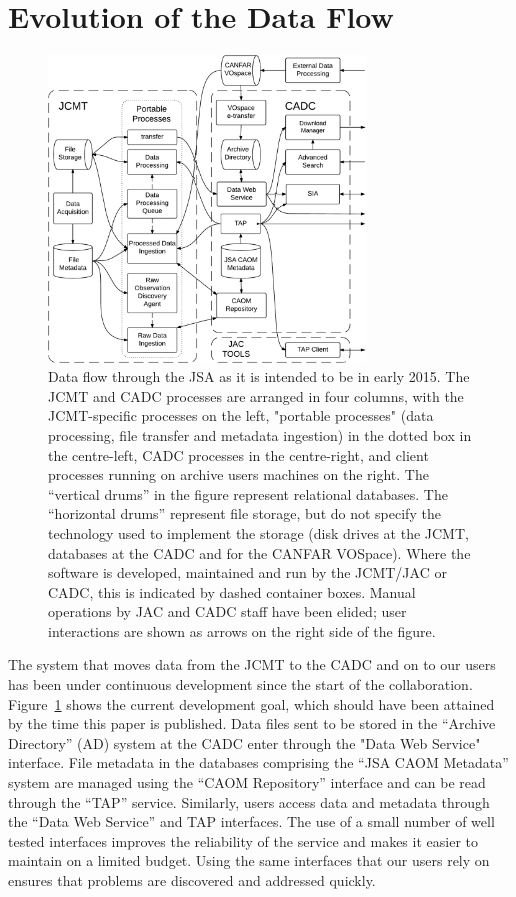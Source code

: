 \documentclass[final,authoryear,5p,times,twocolumn]{elsarticle}
\begin{document}
\section{Evolution of the Data Flow}

\begin{figure}[!ht]
\begin{center}
\includegraphics[width=0.75\textwidth]{jsa_dataflow_2015}
\end{center}
\caption{Data flow through the JSA as it is intended to be in early 2015.  The JCMT and CADC processes are arranged in four columns, with the JCMT-specific processes on the left, "portable processes" (data processing, file transfer and metadata ingestion) in the dotted box in the centre-left, CADC processes in the centre-right, and client processes running on archive users machines on the right.  The ``vertical drums'' in the figure represent relational databases.  The ``horizontal drums'' represent file storage, but do not specify the technology used to implement the storage (disk drives at the JCMT, databases at the CADC and for the CANFAR VOSpace).  Where the software is developed, maintained and run by the JCMT/JAC or CADC, this is indicated by dashed container boxes.     Manual operations by JAC and CADC staff have been elided; user interactions are shown as arrows on the right side of the figure.}
\label{fig:jsadataflow}
\end{figure}

The system that moves data from the JCMT to the CADC and on to our users has been under continuous development since the start of the collaboration.  Figure~\ref{fig:jsadataflow} shows the current development goal, which should have been attained by the time this paper is published.  Data files sent to be stored in the ``Archive Directory'' (AD) system at the CADC enter through the "Data Web Service" interface.  File metadata in the databases comprising the ``JSA CAOM Metadata'' system are managed using the ``CAOM Repository'' interface and can be read through the ``TAP'' service.  Similarly, users access data and metadata through the ``Data Web Service'' and TAP interfaces.  The use of a small number of well tested interfaces improves the reliability of the service and makes it easier to maintain on a limited budget.   Using the same interfaces that our users rely on ensures that problems are discovered and addressed quickly.
\end{document}
